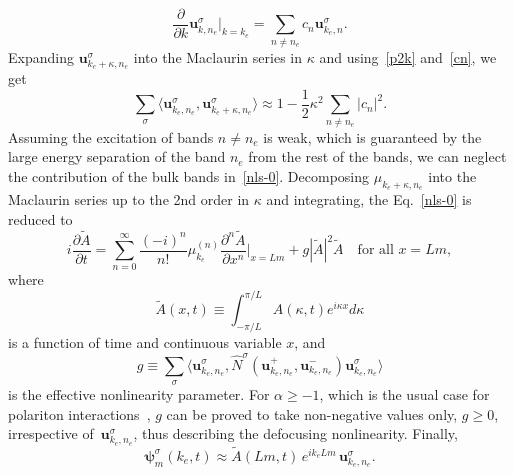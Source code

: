 \documentclass[
aps,
prl,
groupedaddress,
superscriptaddress,
floatfix,
notitlepage
]{revtex4-1}
\newcommand{\p}{\partial}
\begin{document}
\begin{equation}
\frac{\p }{\p k}\pmb{u}^{\sigma}_{k,n_e}\Big|_{k=k_e} = \sum_{n\neq n_e} c_n \pmb{u}^{\sigma}_{k_e,n}.
\label{cn}
\end{equation}
Expanding $\pmb{u}^{\sigma}_{k_e+\kappa,n_e}$ into the Maclaurin series in $\kappa$
and using~\eqref{p2k} and~\eqref{cn}, we get
\begin{equation}
\sum_{\sigma}\langle\pmb{u}^{\sigma}_{k_e,n_e},\pmb{u}^{\sigma}_{k_e+\kappa,n_e}\rangle\approx 1-\frac12 \kappa^2\sum_{n\neq n_e}|c_n|^2.
\label{cond}
\end{equation}
Assuming the excitation of bands $n\neq n_e$ is weak, which is guaranteed by the large energy separation of the band $n_e$ from the rest of the bands, we can neglect
the contribution of the bulk bands in~\eqref{nls-0}.
Decomposing $\mu_{k_e+\kappa,n_e}$ into the Maclaurin series up to the 2nd order in $\kappa$ and integrating, the Eq.~\eqref{nls-0} is reduced to
\begin{equation}
i\frac{\p \tilde{A}}{\p t} =
\sum_{n=0}^{\infty} \frac{(-i)^n}{n!} \mu_{k_e}^{(n)}\frac{\partial^n \tilde{A}}{\partial x^n}\Big|_{x=Lm}
+ g |\tilde{A}|^2 \tilde{A}\quad\text{for all $x=Lm$},
\label{nls-2}
\end{equation}
where 
$$
\tilde{A}(x,t)\equiv \int_{-\pi/L}^{\pi/L} A(\kappa,t) e^{i\kappa x}  d\kappa
$$
is a function of time and continuous variable $x$, and 
$$
g\equiv \sum_\sigma\langle\pmb{u}^{\sigma}_{k_e,n_e},\hat{N}^{\sigma}(\pmb{u}_{k_e,n_e}^+,\pmb{u}_{k_e,n_e}^{-})\pmb{u}^{\sigma}_{k_e,n_e}\rangle
$$
is the effective nonlinearity parameter. For $\alpha \ge -1$, which is the usual case for polariton interactions~\cite{Vladimirova}, $g$ can be proved to take non-negative values only, $g\ge 0$, irrespective of~$\pmb{u}_{k_e,n_e}^\sigma$, thus describing the defocusing nonlinearity.
Finally, 
\begin{equation}
\pmb{\psi}^{\sigma}_m(k_e,t) \approx  \tilde{A}(Lm,t)\, e^{i k_e Lm}\, \pmb{u}^{\sigma}_{k_e,n_e}.
\label{psi-final}
\end{equation}
\end{document}
